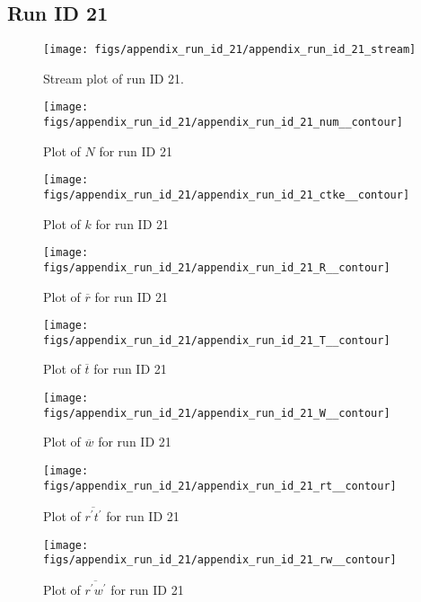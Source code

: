 \subsection{Run ID 21}
\begin{figure}[H]
\centering
\texttt{[image: figs/appendix\_run\_id\_21/appendix\_run\_id\_21\_stream]}
\caption{Stream plot of run ID 21.}
\label{fig:appendix_run_id_21_stream}
\end{figure}


\begin{figure}[H]
\centering
\texttt{[image: figs/appendix\_run\_id\_21/appendix\_run\_id\_21\_num\_\_contour]}
\caption{Plot of $N$ for run ID 21}
\label{fig:appendix_run_id_21_num__contour}
\end{figure}


\begin{figure}[H]
\centering
\texttt{[image: figs/appendix\_run\_id\_21/appendix\_run\_id\_21\_ctke\_\_contour]}
\caption{Plot of $k$ for run ID 21}
\label{fig:appendix_run_id_21_ctke__contour}
\end{figure}


\begin{figure}[H]
\centering
\texttt{[image: figs/appendix\_run\_id\_21/appendix\_run\_id\_21\_R\_\_contour]}
\caption{Plot of $\overline{r}$ for run ID 21}
\label{fig:appendix_run_id_21_R__contour}
\end{figure}


\begin{figure}[H]
\centering
\texttt{[image: figs/appendix\_run\_id\_21/appendix\_run\_id\_21\_T\_\_contour]}
\caption{Plot of $\overline{t}$ for run ID 21}
\label{fig:appendix_run_id_21_T__contour}
\end{figure}


\begin{figure}[H]
\centering
\texttt{[image: figs/appendix\_run\_id\_21/appendix\_run\_id\_21\_W\_\_contour]}
\caption{Plot of $\overline{w}$ for run ID 21}
\label{fig:appendix_run_id_21_W__contour}
\end{figure}


\begin{figure}[H]
\centering
\texttt{[image: figs/appendix\_run\_id\_21/appendix\_run\_id\_21\_rt\_\_contour]}
\caption{Plot of $\overline{r^\prime t^\prime}$ for run ID 21}
\label{fig:appendix_run_id_21_rt__contour}
\end{figure}


\begin{figure}[H]
\centering
\texttt{[image: figs/appendix\_run\_id\_21/appendix\_run\_id\_21\_rw\_\_contour]}
\caption{Plot of $\overline{r^\prime w^\prime}$ for run ID 21}
\label{fig:appendix_run_id_21_rw__contour}
\end{figure}


